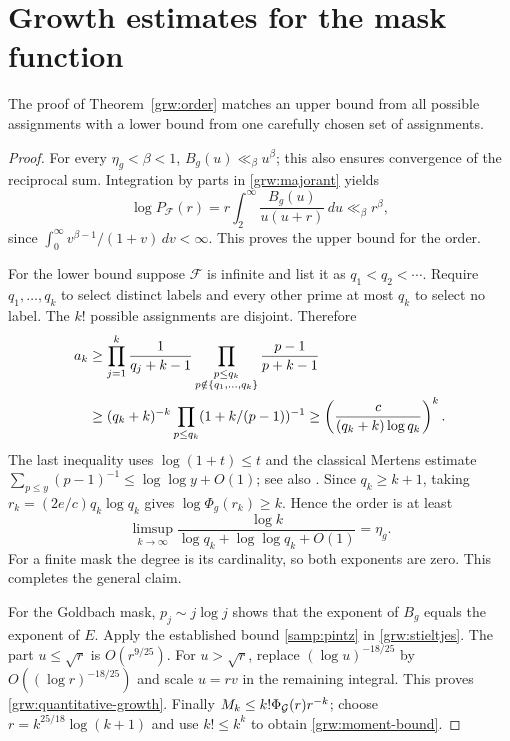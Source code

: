 \section{Growth estimates for the mask function}
\label{grw:proofs}

The proof of Theorem~\ref{grw:order} matches an upper bound from all
possible assignments with a lower bound from one carefully chosen set
of assignments.

\begin{proof}
For every $\eta_g<\beta<1$, $B_g(u)\ll_\beta u^\beta$;
this also ensures convergence of the reciprocal sum.  Integration
by parts in \eqref{grw:majorant} yields
\begin{equation}
 \log P_{\mathcal F}(r)
 =r\int_2^\infty\frac{B_g(u)}{u(u+r)}\,du
 \ll_\beta r^\beta,
 \label{grw:stieltjes}
\end{equation}
since $\int_0^\infty v^{\beta-1}/(1+v)\,dv<\infty$.
This proves the upper bound for the order.

For the lower bound suppose $\mathcal F$ is infinite and list it
as $q_1<q_2<\cdots$.  Require $q_1,\ldots,q_k$ to select distinct
labels and every other prime at most $q_k$ to select no label.
The $k!$ possible assignments are disjoint.  Therefore
\begin{align}
 a_k&\ge\prod_{j=1}^k\frac1{q_j+k-1}
       \prod_{\substack{p\le q_k\\p\notin\{q_1,\ldots,q_k\}}}
             \frac{p-1}{p+k-1}\notag\\
 &\ge(q_k+k)^{-k}\prod_{p\le q_k}
                         (1+k/(p-1))^{-1}
 \ge\left(\frac{c}{(q_k+k)\log q_k}\right)^k.
 \label{grw:lower-coefficient}
\end{align}
The last inequality uses $\log(1+t)\le t$ and the classical
Mertens estimate $\sum_{p\le y}(p-1)^{-1}\le\log\log y+O(1)$;
see also \cite[Section~2]{fndLagarias2002}.
Since $q_k\ge k+1$, taking $r_k=(2e/c)q_k\log q_k$ gives
$\log\Phi_g(r_k)\ge k$.  Hence the order is at least
\[
 \limsup_{k\to\infty}
 \frac{\log k}{\log q_k+\log\log q_k+O(1)}=\eta_g.
\]
For a finite mask the degree is its cardinality, so both exponents
are zero.  This completes the general claim.

For the Goldbach mask, $p_j\sim j\log j$ shows that the exponent
of $B_g$ equals the exponent of $E$.  Apply the established bound
\eqref{samp:pintz} in \eqref{grw:stieltjes}.  The part $u\le\sqrt r$
is $O(r^{9/25})$.  For $u>\sqrt r$, replace $(\log u)^{-18/25}$
by $O((\log r)^{-18/25})$ and scale $u=rv$ in the remaining
integral.  This proves \eqref{grw:quantitative-growth}.
Finally $M_k\le k!\Phi_{\mathcal G}(r)r^{-k}$; choose
$r=k^{25/18}\log(k+1)$ and use $k!\le k^k$ to obtain
\eqref{grw:moment-bound}.
\end{proof}
